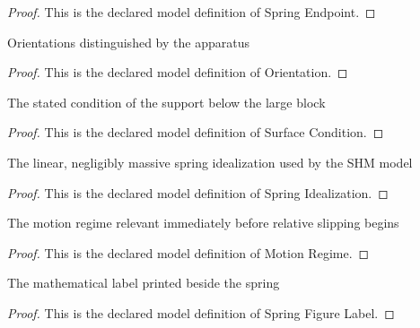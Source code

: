 \begin{proof}
  This is the declared model definition of Spring Endpoint.
\end{proof}
\begin{definition}[Orientation]
  \label{def:physics:phyx-mini-0258:phyxminiproblems-problemphyxmini0258-orientation}
  Orientations distinguished by the apparatus
\end{definition}
\begin{proof}
  This is the declared model definition of Orientation.
\end{proof}
\begin{definition}
  \label{def:physics:phyx-mini-0258:phyxminiproblems-problemphyxmini0258-surfacecondition}
  The stated condition of the support below the large block
\end{definition}
\begin{proof}
  This is the declared model definition of Surface Condition.
\end{proof}
\begin{definition}
  \label{def:physics:phyx-mini-0258:phyxminiproblems-problemphyxmini0258-springidealization}
  The linear, negligibly massive spring idealization used by the SHM model
\end{definition}
\begin{proof}
  This is the declared model definition of Spring Idealization.
\end{proof}
\begin{definition}
  \label{def:physics:phyx-mini-0258:phyxminiproblems-problemphyxmini0258-motionregime}
  The motion regime relevant immediately before relative slipping begins
\end{definition}
\begin{proof}
  This is the declared model definition of Motion Regime.
\end{proof}
\begin{definition}
  \label{def:physics:phyx-mini-0258:phyxminiproblems-problemphyxmini0258-springfigurelabel}
  The mathematical label printed beside the spring
\end{definition}
\begin{proof}
  This is the declared model definition of Spring Figure Label.
\end{proof}
